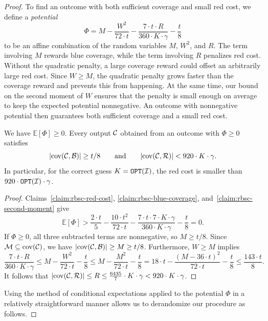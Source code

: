 \begin{proof}
To find an outcome with both sufficient coverage and small red cost, we define a \emph{potential}
\begin{equation}\label{eq:rbsc-potential}
 \Phi=M-\frac{W^2}{72\cdot t}-\frac{7\cdot t\cdot R}{360\cdot K\cdot \gamma}-\frac{t}{8}
\end{equation}
to be an affine combination of the random variables $M$, $W^2$, and $R$. The term involving $M$ rewards blue coverage, while the term involving $R$ penalizes red cost. Without the quadratic penalty, a large coverage reward could offset an arbitrarily large red cost. Since $W\geq M$, the quadratic penalty grows faster than the coverage reward and prevents this from happening. At the same time, our bound on the second moment of $W$ ensures that the penalty is small enough on average to keep the expected potential nonnegative. An outcome with nonnegative potential then guarantees both sufficient coverage and a small red cost.
\begin{claim}\label{claim:rbsc-positive-potential}
We have $\mathbb{E}[\Phi]\geq0$. Every output $\mathcal{C}$ obtained from an outcome with $\Phi\geq0$ satisfies
\[
 \mathopen{}\left| \operatorname{cov}\mathopen{}\left( \mathcal{C},\mathcal{B} \right) \right|\geq t/8
 \qquad\text{and}\qquad
 \mathopen{}\left| \operatorname{cov}\mathopen{}\left( \mathcal{C},\mathcal{R} \right) \right|<920\cdot K\cdot \gamma.
\]
In particular, for the correct guess $K=\texttt{OPT}\mathopen{}\left( \mathcal{I} \right)$, the red cost is smaller than $920\cdot\texttt{OPT}\mathopen{}\left( \mathcal{I} \right)\cdot \gamma$.
\end{claim}
\begin{proof}
Claims~\ref{claim:rbsc-red-cost}, \ref{claim:rbsc-blue-coverage}, and~\ref{claim:rbsc-second-moment} give
\[
 \mathbb{E}[\Phi]
 >\frac{2\cdot t}{5}-\frac{10\cdot t^2}{72\cdot t}-\frac{7\cdot t\cdot7\cdot K\cdot \gamma}{360\cdot K\cdot \gamma}-\frac{t}{8}
 =0.
\]
If $\Phi\geq0$, all three subtracted terms are nonnegative, so $M\geq t/8$. Since $\mathcal{M}\subseteq\operatorname{cov}\mathopen{}\left( \mathcal{C} \right)$, we have $\mathopen{}\left| \operatorname{cov}\mathopen{}\left( \mathcal{C},\mathcal{B} \right) \right|\geq M\geq t/8$. Furthermore, $W\geq M$ implies
\[
 \frac{7\cdot t\cdot R}{360\cdot K\cdot \gamma}
 \leq M-\frac{W^2}{72\cdot t}-\frac{t}{8}
 \leq M-\frac{M^2}{72\cdot t}-\frac{t}{8}
 =18\cdot t-\frac{(M-36\cdot t)^2}{72\cdot t}-\frac{t}{8}
 \leq\frac{143\cdot t}{8}.
\]
It follows that $\mathopen{}\left| \operatorname{cov}\mathopen{}\left( \mathcal{C},\mathcal{R} \right) \right|\leq R\leq\frac{6435}{7}\cdot K\cdot \gamma<920\cdot K\cdot \gamma$.
\end{proof}

Using the method of conditional expectations applied to the potential $\Phi$ in a relatively straightforward manner allows us to derandomize our procedure as follows.


\end{proof}
